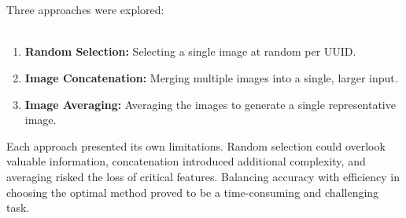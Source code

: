 \\~\\
Three approaches were explored:
\\~\\


\begin{enumerate}
    \item \textbf{Random Selection:} Selecting a single image at random per UUID.
    \item \textbf{Image Concatenation:} Merging multiple images into a single, larger input.
    \item \textbf{Image Averaging:} Averaging the images to generate a single representative image.
\end{enumerate}

Each approach presented its own limitations.
Random selection could overlook valuable information, concatenation introduced additional complexity, and averaging risked the loss of critical features.
Balancing accuracy with efficiency in choosing the optimal method proved to be a time-consuming and challenging task.



